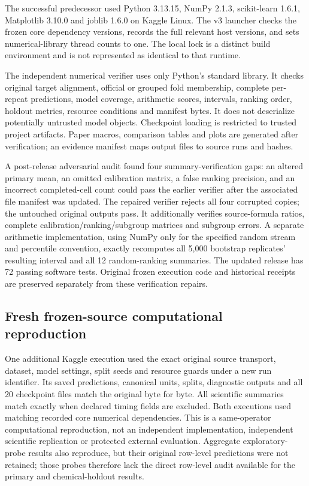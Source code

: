 \documentclass[11pt]{article}
\begin{document}
The successful predecessor used Python 3.13.15, NumPy 2.1.3, scikit-learn 1.6.1, Matplotlib 3.10.0 and joblib 1.6.0 on Kaggle Linux. The v3 launcher checks the frozen core dependency versions, records the full relevant host versions, and sets numerical-library thread counts to one. The local lock is a distinct build environment and is not represented as identical to that runtime.

The independent numerical verifier uses only Python's standard library. It checks original target alignment, official or grouped fold membership, complete per-repeat predictions, model coverage, arithmetic scores, intervals, ranking order, holdout metrics, resource conditions and manifest bytes. It does not deserialize potentially untrusted model objects. Checkpoint loading is restricted to trusted project artifacts. Paper macros, comparison tables and plots are generated after verification; an evidence manifest maps output files to source runs and hashes.

A post-release adversarial audit found four summary-verification gaps: an altered primary mean, an omitted calibration matrix, a false ranking precision, and an incorrect completed-cell count could pass the earlier verifier after the associated file manifest was updated. The repaired verifier rejects all four corrupted copies; the untouched original outputs pass. It additionally verifies source-formula ratios, complete calibration/ranking/subgroup matrices and subgroup errors. A separate arithmetic implementation, using NumPy only for the specified random stream and percentile convention, exactly recomputes all 5,000 bootstrap replicates' resulting interval and all 12 random-ranking summaries. The updated release has 72 passing software tests. Original frozen execution code and historical receipts are preserved separately from these verification repairs.

\subsection{Fresh frozen-source computational reproduction}

One additional Kaggle execution used the exact original source transport, dataset, model settings, split seeds and resource guards under a new run identifier. Its saved predictions, canonical units, splits, diagnostic outputs and all 20 checkpoint files match the original byte for byte. All scientific summaries match exactly when declared timing fields are excluded. Both executions used matching recorded core numerical dependencies. This is a same-operator computational reproduction, not an independent implementation, independent scientific replication or protected external evaluation. Aggregate exploratory-probe results also reproduce, but their original row-level predictions were not retained; those probes therefore lack the direct row-level audit available for the primary and chemical-holdout results.
\end{document}
